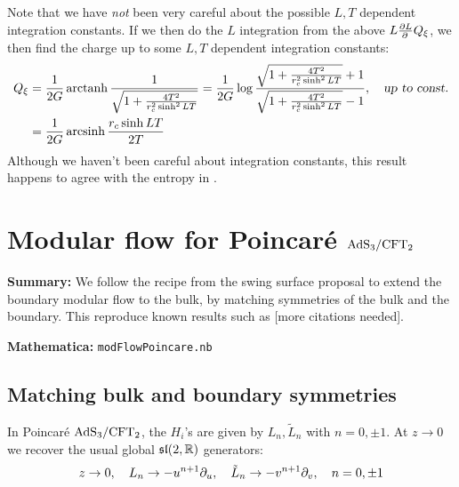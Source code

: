 \documentclass[11pt,a4paper,utf8]{article}
\begin{document}
	Note that we have \textit{not} been very careful about the possible $L,T$ dependent integration constants. If we then do the $L$ integration from the above $L \frac{\partial{L}}{\partial{\,}}Q_\xi$, we then find the charge up to some $L,T$ dependent integration constants:
	\begin{equation}
	\begin{aligned}
		Q_\xi
		&= \frac{1}{2G} \operatorname{arctanh}
			\frac{1}{\sqrt{
				1 + \frac{4T^2}{r_c^2 \sinh^2 LT}
			}}
		= \frac{1}{2G} \log
			\frac{
				\sqrt{
					1 + \frac{4T^2}{r_c^2 \sinh^2 LT}
				} + 1
			}{
				\sqrt{
					1 + \frac{4T^2}{r_c^2 \sinh^2 LT}
				} - 1
			},
	\quad\textsl{up to const.} \\
		&= \frac{1}{2G} \operatorname{arcsinh}
			\frac{r_c \sinh LT}{2T}
	\end{aligned}
	\end{equation}
	Although we haven't been careful about integration constants, this result happens to agree with the entropy in \cite{Lewkowycz:2019xse}. 
	
	
\appendix

\section{Modular flow for Poincar\'e $\mathrm{AdS}_3/\mathrm{CFT}_2$}
\label{sect:modFlowPoincare}

\textbf{Summary:} We follow the recipe from the swing surface proposal \cite{Apolo:2020bld,Apolo:2020qjm} to extend the boundary modular flow to the bulk, by matching symmetries of the bulk and the boundary. This reproduce known results such as \cite{Lashkari:2016idm,Czech:2019vih,Apolo:2020qjm} [more citations needed].

\noindent\textbf{Mathematica:} \texttt{modFlowPoincare.nb}

\subsection{Matching bulk and boundary symmetries}
	In Poincar\'e $\mathrm{AdS}_3/\mathrm{CFT}_2$, the $H_i$'s are given by $L_n,\tilde{L}_n$ with $n=0,\pm 1$. At $z\to 0$ we recover the usual global $\mathfrak{sl}(2,\mathbb{R})$ generators:
	\begin{equation}
		z\to 0,
	\quad
		      L_n \to -u^{n+1} \partial_{u},\quad
		\tilde{L}_n \to -v^{n+1} \partial_{v},\quad
	n = 0,\pm 1
	\end{equation}
	
\end{document}

